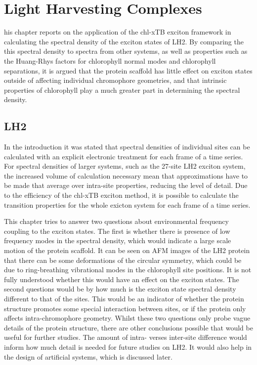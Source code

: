 %
%
\let\textcircled=\pgftextcircled
\chapter{Light Harvesting Complexes}
\label{chap:LH2}

his chapter reports on the application of the chl-xTB exciton framework
in calculating the spectral density of the exciton states of LH2. By comparing the
this spectral density to spectra from other systems, as well as properties such
as the Huang-Rhys factors for chlorophyll normal modes and chlorophyll separations,
it is argued that the protein scaffold has little effect on exciton states outside
of affecting individual chromophore geometries, and that intrinsic properties of
chlorophyll play a much greater part in determining the spectral density.

\section{LH2}
\label{sec:LH2}

In the introduction it was stated that spectral densities of individual sites can
be calculated with an explicit electronic treatment for each frame of a time series.
For spectral densities of larger systems, such as the 27-site LH2 exciton system,
the increased volume of calculation necessary mean that approximations have to be
made that average over intra-site properties, reducing the level of detail. Due 
to the efficiency of the chl-xTB exciton method, it is possible to calculate the
transition properties for the whole exicton system for each frame of a time series.

This chapter tries to answer two questions about environmental frequency coupling
to the exciton states. The first is whether there is presence of low frequency modes
in the spectral density, which would indicate a large scale motion of the protein
scaffold. It can be seen on AFM images of the LH2 protein that there can be some 
deformations of the circular symmetry, which could be due to ring-breathing vibrational
modes in the chlorophyll site positions. It is not fully understood whether this
would have an effect on the exciton states. The second questions would be by how
much is the exciton state spectral density different to that of the sites. This
would be an indicator of whether the protein structure promotes some special interaction 
between sites, or if the protein only affects intra-chromophore geometry. Whilst
these two questions only probe vague details of the protein structure, there are
other conclusions possible that would be useful for further studies. The amount 
of intra- verses inter-site difference would inform how much detail is needed for
future studies on LH2. It would also help in the design of artificial systems, which
is discussed later.

